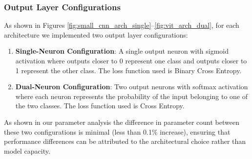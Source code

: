 \FloatBarrier
\subsubsection{Output Layer Configurations}

As shown in Figures \ref{fig:small_cnn_arch_single}--\ref{fig:vit_arch_dual}, for each architecture we implemented two output layer configurations:

\begin{enumerate}
\item \textbf{Single-Neuron Configuration}: A single output neuron with sigmoid activation where outputs closer to 0 represent one class and outputs closer to 1 represent the other class. The loss function used is Binary Cross Entropy.

\item \textbf{Dual-Neuron Configuration}: Two output neurons with softmax activation where each neuron represents the probability of the input belonging to one of the two classes. The loss function used is Cross Entropy.
\end{enumerate}

As shown in our parameter analysis the difference in parameter count between these two configurations is minimal (less than 0.1\% increase), ensuring that performance differences can be attributed to the architectural choice rather than model capacity.
